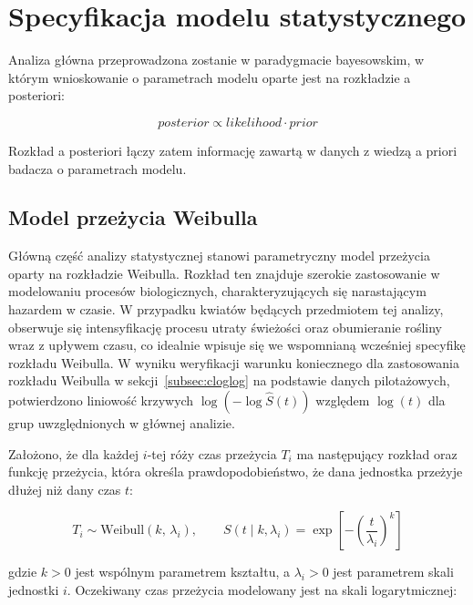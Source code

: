 \documentclass[12pt, a4paper]{article}
\begin{document}
\section{Specyfikacja modelu statystycznego}\label{sec:model_structure}
Analiza główna przeprowadzona zostanie w paradygmacie bayesowskim, w którym wnioskowanie o parametrach modelu oparte jest na rozkładzie a posteriori:

\begin{equation}
    posterior \propto likelihood \cdot prior
    \label{eq:posterior}
\end{equation}

Rozkład a posteriori łączy zatem informację zawartą w danych z wiedzą a priori badacza o parametrach modelu.
\subsection{Model przeżycia Weibulla}\label{subsec:weibull_model}

Główną część analizy statystycznej stanowi parametryczny model przeżycia oparty na rozkładzie Weibulla. Rozkład ten znajduje szerokie zastosowanie w modelowaniu procesów biologicznych, charakteryzujących się narastającym hazardem w czasie. W przypadku kwiatów będących przedmiotem tej analizy, obserwuje się intensyfikację procesu utraty świeżości oraz obumieranie rośliny wraz z upływem czasu, co idealnie wpisuje się we wspomnianą wcześniej specyfikę rozkładu Weibulla. W wyniku weryfikacji warunku koniecznego dla zastosowania rozkładu Weibulla w sekcji~\ref{subsec:cloglog} na podstawie danych pilotażowych, potwierdzono liniowość krzywych $\log(-\log\hat{S}(t))$ względem $\log(t)$ dla grup uwzględnionych w głównej analizie.

Założono, że dla każdej $i$-tej róży czas przeżycia $T_i$ ma następujący rozkład oraz funkcję przeżycia, która określa prawdopodobieństwo, że dana jednostka przeżyje dłużej niż dany czas $t$:

\begin{equation}
    T_i \sim \mathrm{Weibull}(k,\, \lambda_i), \qquad
    S(t \mid k, \lambda_i) = \exp\!\left[-\!\left(\frac{t}{\lambda_i}\right)^{\!k}\right]
    \label{eq:weibull_model}
\end{equation}

gdzie $k > 0$ jest wspólnym parametrem kształtu, a $\lambda_i > 0$ jest parametrem skali jednostki $i$. Oczekiwany czas przeżycia modelowany jest na skali logarytmicznej:
\end{document}
